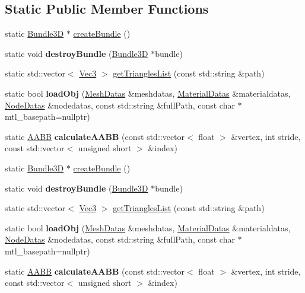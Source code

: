 \subsection*{Static Public Member Functions}
\begin{DoxyCompactItemize}
\item 
static \hyperlink{classBundle3D}{Bundle3D} $\ast$ \hyperlink{classBundle3D_afeb39c466af4193d183ae1bac9cf97b9}{create\+Bundle} ()
\item 
\mbox{\label{classBundle3D_a7b3dbee83513933ed9a6c064fa8243c5}} 
static void {\bfseries destroy\+Bundle} (\hyperlink{classBundle3D}{Bundle3D} $\ast$bundle)
\item 
static std\+::vector$<$ \hyperlink{classVec3}{Vec3} $>$ \hyperlink{classBundle3D_ae97afafbab50ed831d26097e8c94b6bf}{get\+Triangles\+List} (const std\+::string \&path)
\item 
\mbox{\label{classBundle3D_af6c970afda2295f4d47bc1c8ccb020f0}} 
static bool {\bfseries load\+Obj} (\hyperlink{structMeshDatas}{Mesh\+Datas} \&meshdatas, \hyperlink{structMaterialDatas}{Material\+Datas} \&materialdatas, \hyperlink{structNodeDatas}{Node\+Datas} \&nodedatas, const std\+::string \&full\+Path, const char $\ast$mtl\+\_\+basepath=nullptr)
\item 
\mbox{\label{classBundle3D_a63adb2619e805f205fe20edaa2294151}} 
static \hyperlink{classAABB}{A\+A\+BB} {\bfseries calculate\+A\+A\+BB} (const std\+::vector$<$ float $>$ \&vertex, int stride, const std\+::vector$<$ unsigned short $>$ \&index)
\item 
static \hyperlink{classBundle3D}{Bundle3D} $\ast$ \hyperlink{classBundle3D_a8b31b51ff4e3c3d39cb8e13c7dd07993}{create\+Bundle} ()
\item 
\mbox{\label{classBundle3D_aa5cd2657b8c1adb9faa22a8b50fb5116}} 
static void {\bfseries destroy\+Bundle} (\hyperlink{classBundle3D}{Bundle3D} $\ast$bundle)
\item 
static std\+::vector$<$ \hyperlink{classVec3}{Vec3} $>$ \hyperlink{classBundle3D_a3e859939382cca035e3eb12425945db6}{get\+Triangles\+List} (const std\+::string \&path)
\item 
\mbox{\label{classBundle3D_adf1b22d1ae937c3467c21171ebd79795}} 
static bool {\bfseries load\+Obj} (\hyperlink{structMeshDatas}{Mesh\+Datas} \&meshdatas, \hyperlink{structMaterialDatas}{Material\+Datas} \&materialdatas, \hyperlink{structNodeDatas}{Node\+Datas} \&nodedatas, const std\+::string \&full\+Path, const char $\ast$mtl\+\_\+basepath=nullptr)
\item 
\mbox{\label{classBundle3D_aba72e068b2317aa567f66820d1db8134}} 
static \hyperlink{classAABB}{A\+A\+BB} {\bfseries calculate\+A\+A\+BB} (const std\+::vector$<$ float $>$ \&vertex, int stride, const std\+::vector$<$ unsigned short $>$ \&index)
\end{DoxyCompactItemize}
